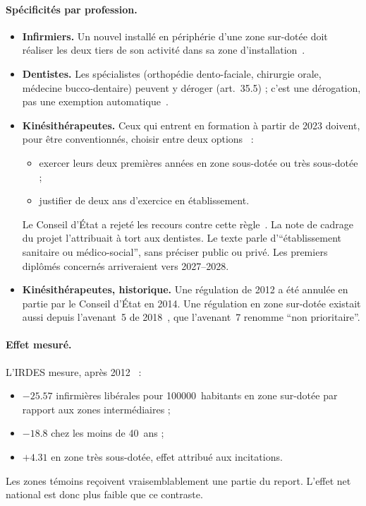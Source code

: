 \paragraph{Spécificités par profession.}
\begin{itemize}
\item \textbf{Infirmiers.} Un nouvel installé en périphérie d'une zone
  sur-dotée doit réaliser les deux tiers de son activité dans sa zone
  d'installation~\cite{a1-avenant6ide}.
\item \textbf{Dentistes.} Les spécialistes (orthopédie dento-faciale,
  chirurgie orale, médecine bucco-dentaire) peuvent y déroger (art.~35.5) ; c'est une dérogation, pas une exemption automatique~\cite{a1-conventioncd2023}.
\item \textbf{Kinésithérapeutes.} Ceux qui entrent en formation à partir
  de 2023 doivent, pour être conventionnés, choisir entre deux options~\cite{a1-avenant7mk} :
  \begin{itemize}
  \item exercer leurs deux premières années en zone sous-dotée ou très
    sous-dotée ;
  \item justifier de deux ans d'exercice en établissement.
  \end{itemize}
  Le Conseil d'État a rejeté les recours contre cette règle~\cite{a1-ce488665}.
  La note de cadrage du projet l'attribuait à tort aux dentistes. Le texte
  parle d'\enquote{établissement sanitaire ou médico-social}, sans préciser
  public ou privé. Les premiers diplômés concernés arriveraient vers
  2027--2028\derive.
\item \textbf{Kinésithérapeutes, historique.} Une régulation de 2012 a été
  annulée en partie par le Conseil d'État en 2014. Une régulation en zone
  sur-dotée existait aussi depuis l'avenant~5 de 2018~\cite{a1-ccomptes2024},
  que l'avenant~7 renomme \enquote{non prioritaire}.
\end{itemize}

\paragraph{Effet mesuré.}
L'IRDES mesure, après 2012~\cite{a1-irdes270} :
\begin{itemize}
\item $\num{-25.57}$ infirmières libérales pour \num{100000}~habitants en
  zone sur-dotée par rapport aux zones intermédiaires ;
\item $\num{-18.8}$ chez les moins de 40~ans ;
\item $+\num{4.31}$ en zone très sous-dotée, effet attribué aux
  incitations.
\end{itemize}
Les zones témoins reçoivent vraisemblablement une partie du report. L'effet
net national est donc plus faible que ce contraste.

